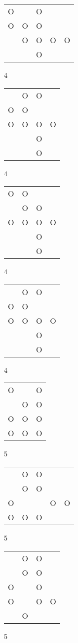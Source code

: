 \begin{tabular}{|m{0.2cm}m{0.2cm}m{0.2cm}m{0.2cm}m{0.2cm}|}\hline
O& &O& & \\
O&O&O& & \\
 &O&O&O&O\\
 & &O& & \\
\hline\end{tabular}4
\begin{tabular}{|m{0.2cm}m{0.2cm}m{0.2cm}m{0.2cm}|}\hline
 &O&O& \\
O&O& & \\
O&O&O&O\\
 & &O& \\
 & &O& \\
\hline\end{tabular}4
\begin{tabular}{|m{0.2cm}m{0.2cm}m{0.2cm}m{0.2cm}|}\hline
O&O& & \\
 &O&O& \\
O&O&O&O\\
 & &O& \\
 & &O& \\
\hline\end{tabular}4
\begin{tabular}{|m{0.2cm}m{0.2cm}m{0.2cm}m{0.2cm}|}\hline
 &O&O& \\
O&O& & \\
O&O&O&O\\
 & &O& \\
 & &O& \\
\hline\end{tabular}4
\begin{tabular}{|m{0.2cm}m{0.2cm}m{0.2cm}|}\hline
O& &O\\
 &O&O\\
O&O&O\\
O&O&O\\
\hline\end{tabular}5
\begin{tabular}{|m{0.2cm}m{0.2cm}m{0.2cm}m{0.2cm}m{0.2cm}|}\hline
 &O&O& & \\
 &O&O& & \\
O& & &O&O\\
O&O&O& & \\
\hline\end{tabular}5
\begin{tabular}{|m{0.2cm}m{0.2cm}m{0.2cm}m{0.2cm}|}\hline
 &O&O& \\
 &O&O& \\
O& &O& \\
O& &O&O\\
 &O& & \\
\hline\end{tabular}5

